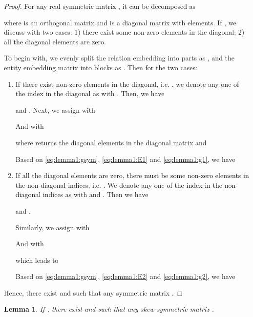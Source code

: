 \documentclass[10pt,journal,compsoc]{IEEEtran}
\newtheorem{lemma}{Lemma}
\begin{document}
\begin{proof}
For any real symmetric matrix ,
it can be decomposed as~\cite{horn2012matrix}

where  is an orthogonal matrix 
and  
is a diagonal matrix with  elements.
If ,
we discuss with two cases: 
1) there exist some non-zero elements in the diagonal;
2) all the diagonal elements are zero.

To begin with,
we evenly split
the relation embedding into  parts as
,
and
the entity embedding matrix into  blocks as
.
Then for the two cases:

\begin{enumerate}[leftmargin=*]
	\item If there exist non-zero elements in the diagonal,
	i.e. ,
	we denote any one of the index in the diagonal as  with .
	Then, 
	we have
	
	and .
	Next,
	we assign  with
	
	And  with
	
	where  returns the diagonal elements in the diagonal matrix 
	and 
	
	
	Based on \eqref{eq:lemma1:gsym}, \eqref{eq:lemma1:E1} and \eqref{eq:lemma1:g1},
	we have 
	
	
	\item If all the diagonal elements are zero,
	there must be some non-zero elements in the non-diagonal indices,
	i.e. 
	.
	We denote any one of the index in the non-diagonal indices as 
	with  and .
	Then we have
	
	and .
	
	Similarly,
	we assign 
	 with
	
	And  with
	
	which leads to
	
	Based on \eqref{eq:lemma1:gsym}, \eqref{eq:lemma1:E2} and \eqref{eq:lemma1:g2},
	we have
	
\end{enumerate}
Hence, 
there exist  and  
such that any symmetric matrix .
\end{proof}







\begin{lemma}
\label{lm:ssym}
If ,
there exist  and  
such that any skew-symmetric matrix .
\end{lemma}
\end{document}
